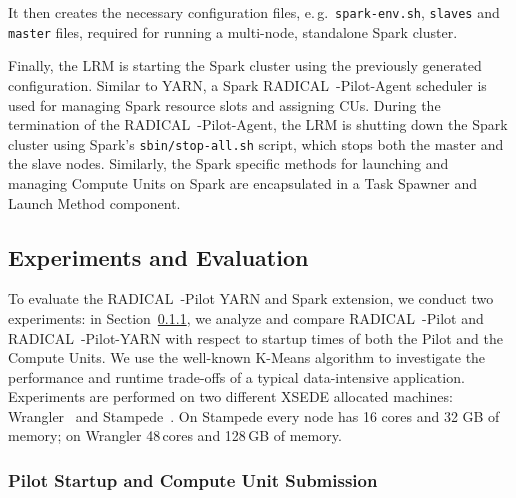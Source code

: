 It then creates the necessary configuration files, e.\,g.\ \texttt{spark-env.sh}, \texttt{slaves} and \texttt{master} files, required for running a multi-node, standalone Spark cluster.

Finally, the LRM is starting the Spark cluster using the previously generated configuration.
Similar to YARN, a Spark RADICAL~-Pilot-Agent scheduler is used for managing Spark resource slots and assigning CUs.
During the termination of the RADICAL~-Pilot-Agent, the LRM is shutting down the Spark cluster using Spark’s \texttt{sbin/stop-all.sh} script, which stops both the master and the slave nodes.
Similarly, the Spark specific methods for launching and managing Compute Units on Spark are encapsulated in a Task Spawner and Launch Method component.

\subsection{Experiments and Evaluation}
\label{ssec:rph-exps}

To evaluate the RADICAL~-Pilot YARN and Spark extension, we conduct two experiments: in Section~\ref{sssec:startup_pilot_unit}, we analyze and compare RADICAL~-Pilot and RADICAL~-Pilot-YARN with respect to startup times of both the Pilot and the Compute Units.
We use the well-known K-Means algorithm to investigate the performance and runtime trade-offs of a typical data-intensive application.
Experiments are performed on two different XSEDE allocated machines: Wrangler~\cite{wrangler} and Stampede~\cite{stampede}.
On Stampede every node has 16 cores and 32 GB of memory; on Wrangler 48\,cores and 128\,GB of memory.

\subsubsection{Pilot Startup and Compute Unit Submission}
\label{sssec:startup_pilot_unit}

